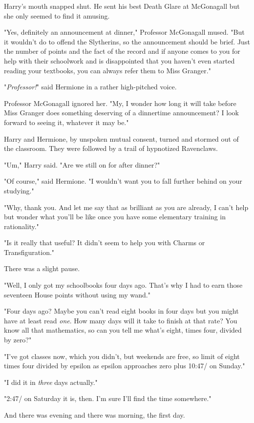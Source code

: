 Harry's mouth snapped shut. He sent his best Death Glare at McGonagall but she
only seemed to find it amusing.

"Yes, definitely an announcement at dinner," Professor McGonagall mused. "But
it wouldn't do to offend the Slytherins, so the announcement should be brief.
Just the number of points and the fact of the record{\el} and if anyone
comes to you for help with their schoolwork and is disappointed that you
haven't even started reading your textbooks, you can always refer them to Miss
Granger."

"\emph{Professor!}" said Hermione in a rather high-pitched voice.

Professor McGonagall ignored her. "My, I wonder how long it will take before
Miss Granger does something deserving of a dinnertime announcement? I look
forward to seeing it, whatever it may be."

Harry and Hermione, by unspoken mutual consent, turned and stormed out of the
classroom. They were followed by a trail of hypnotized Ravenclaws.

"Um," Harry said. "Are we still on for after dinner?"

"Of course," said Hermione. "I wouldn't want you to fall further behind on your
studying."

"Why, thank you. And let me say that as brilliant as you are already, I can't
help but wonder what you'll be like once you have some elementary training in
rationality."

"Is it really that useful? It didn't seem to help you with Charms or
Transfiguration."

There was a slight pause.

"Well, I only got my schoolbooks four days ago. That's why I had to earn those
seventeen House points without using my wand."

"Four days ago? Maybe you can't read eight books in four days but you might
have at least read \emph{one}. How many days will it take to finish at that
rate? You know all that mathematics, so can you tell me what's eight, times
four, divided by zero?"

"I've got classes now, which you didn't, but weekends are free, so{\el}
limit of eight times four divided by epsilon as epsilon approaches zero
plus{\el} 10:47\AM/ on Sunday."

"I did it in \emph{three} days actually."

"2:47\PM/ on Saturday it is, then. I'm sure I'll find the time somewhere."

And there was evening and there was morning, the first day.
